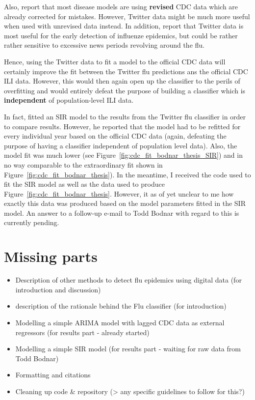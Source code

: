 \documentclass[11pt, a4paper]{report}\usepackage[]{graphicx}\usepackage[]{color}
\begin{document}
Also, \citep{paul_twitter_2014} report that most disease models are using \textbf{revised} CDC data which are already corrected for mistakes. However, Twitter data might be much more useful when used with unrevised data instead. In addition, \citep{aramaki_twitter_2011} report that Twitter data is most useful for the early detection of influenze epidemics, but could be rather rather sensitive to excessive news periods revolving around the flu.\newline

Hence, using the Twitter data to fit a model to the official CDC data will certainly improve the fit between the Twitter flu predictions ans the official CDC ILI data. However, this would then again open up the classifier to the perils of overfitting and would entirely defeat the purpose of building a classifier which is \textbf{independent} of population-level ILI data. \newline

In fact, \citep{bodnar_data_2015} fitted an SIR model to the results from the Twitter flu classifier in order to compare results. However, he reported that the model had to be refitted for every individual year based on the official CDC data (again, defeating the purpose of having a classifier independent of population level data). Also, the model fit was much lower (see Figure~\ref{fig:cdc_fit_bodnar_thesis_SIR}) and in no way comparable to the extraordinary fit shown in Figure~\ref{fig:cdc_fit_bodnar_thesis}). In the meantime, I received the code used to fit the SIR model as well as the data used to produce Figure~\ref{fig:cdc_fit_bodnar_thesis}. However, it as of yet unclear to me how exactly this data was produced based on the model parameters fitted in the SIR model. An answer to a follow-up e-mail to Todd Bodnar with regard to this is currently pending. 

\section{Missing parts}

\begin{itemize}
\item Description of other methods to detect flu epidemics using digital data (for introduction and discussion)
\item description of the rationale behind the Flu classifier (for introduction)
\item Modelling a simple ARIMA model with lagged CDC data as external regressors (for results part - already started)
\item Modelling a simple SIR model (for results part - waiting for raw data from Todd Bodnar)
\item Formatting and citations
\item Cleaning up code \& repository (> any specific guidelines to follow for this?)
\end{itemize}
\end{document}

